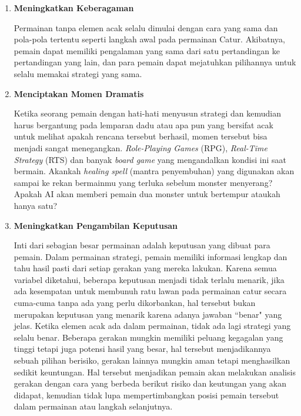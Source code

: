 \begin{subs}
\begin{enumerate}[label=\textbf{\alph*).}]
		\item \textbf{Meningkatkan Keberagaman}
	
		Permainan tanpa elemen acak selalu dimulai dengan cara yang sama dan pola-pola tertentu seperti langkah awal pada permainan Catur. Akibatnya, pemain dapat memiliki pengalaman yang sama dari satu pertandingan ke pertandingan yang lain, dan para pemain dapat mejatuhkan pilihannya untuk selalu memakai strategi yang sama.
		\vspace{1ex}
	
		\item \textbf{Menciptakan Momen Dramatis}
	
		Ketika seorang pemain dengan hati-hati menyusun strategi dan kemudian harus bergantung pada lemparan dadu atau apa pun yang bersifat acak untuk melihat apakah rencana tersebut berhasil, momen tersebut bisa menjadi sangat menegangkan. \textit{Role-Playing Games} (RPG), \textit{Real-Time Strategy} (RTS) dan banyak \textit{board game} yang mengandalkan kondisi ini saat bermain. Akankah \textit{healing spell} (mantra penyembuhan) yang digunakan akan sampai ke rekan bermainmu yang terluka sebelum monster menyerang? Apakah AI akan memberi pemain dua monster untuk bertempur ataukah hanya satu?
		\vspace{1ex}
	
		\item \textbf{Meningkatkan Pengambilan Keputusan}
	
		Inti dari sebagian besar permainan adalah keputusan yang dibuat para pemain. Dalam permainan strategi, pemain memiliki informasi lengkap dan tahu hasil pasti dari setiap gerakan yang mereka lakukan. Karena semua variabel diketahui, beberapa keputusan menjadi tidak terlalu menarik, jika ada kesempatan untuk membunuh ratu lawan pada permainan catur secara cuma-cuma tanpa ada yang perlu dikorbankan, hal tersebut bukan merupakan keputusan yang menarik karena adanya jawaban ``benar" yang jelas. Ketika elemen acak ada dalam permainan, tidak ada lagi strategi yang selalu benar. Beberapa gerakan mungkin memiliki peluang kegagalan yang tinggi tetapi juga potensi hasil yang besar, hal tersebut menjadikannya sebuah pilihan berisiko, gerakan lainnya mungkin aman tetapi menghasilkan sedikit keuntungan. Hal tersebut menjadikan pemain akan melakukan analisis gerakan dengan cara yang berbeda berikut risiko dan keutungan yang akan didapat, kemudian tidak lupa mempertimbangkan posisi pemain tersebut dalam permainan atau langkah selanjutnya.
		\vspace{1ex}
		

\end{enumerate}
\end{subs}
